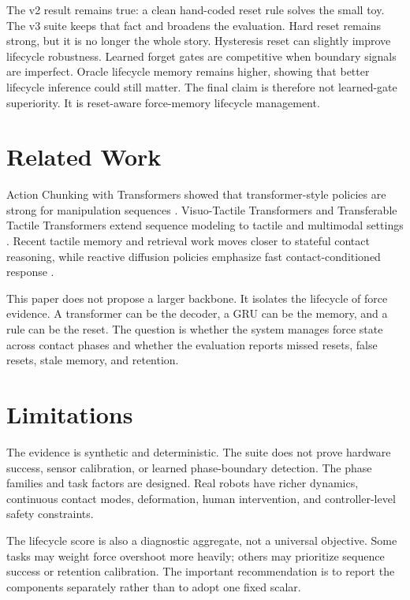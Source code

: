 \documentclass{article}
\begin{document}
The v2 result remains true: a clean hand-coded reset rule solves the small toy.
The v3 suite keeps that fact and broadens the evaluation. Hard reset remains
strong, but it is no longer the whole story. Hysteresis reset can slightly
improve lifecycle robustness. Learned forget gates are competitive when boundary
signals are imperfect. Oracle lifecycle memory remains higher, showing that
better lifecycle inference could still matter. The final claim is therefore not
learned-gate superiority. It is reset-aware force-memory lifecycle management.

\section{Related Work}

Action Chunking with Transformers showed that transformer-style policies are
strong for manipulation sequences \citep{zhou2023act}. Visuo-Tactile
Transformers and Transferable Tactile Transformers extend sequence modeling to
tactile and multimodal settings \citep{chen2022vtt,zhao2024t3}. Recent tactile
memory and retrieval work moves closer to stateful contact reasoning, while
reactive diffusion policies emphasize fast contact-conditioned response
\citep{tamesobot2026,tactileretrieval2025,reactivediffusion2025}.

This paper does not propose a larger backbone. It isolates the lifecycle of
force evidence. A transformer can be the decoder, a GRU can be the memory, and a
rule can be the reset. The question is whether the system manages force state
across contact phases and whether the evaluation reports missed resets, false
resets, stale memory, and retention.

\section{Limitations}

The evidence is synthetic and deterministic. The suite does not prove hardware
success, sensor calibration, or learned phase-boundary detection. The phase
families and task factors are designed. Real robots have richer dynamics,
continuous contact modes, deformation, human intervention, and controller-level
safety constraints.

The lifecycle score is also a diagnostic aggregate, not a universal objective.
Some tasks may weight force overshoot more heavily; others may prioritize
sequence success or retention calibration. The important recommendation is to
report the components separately rather than to adopt one fixed scalar.
\end{document}
